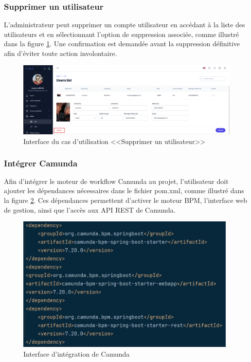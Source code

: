 \subsubsection{Supprimer un utilisateur}
L’administrateur peut supprimer un compte utilisateur en accédant à la liste des utilisateurs et en sélectionnant l’option de suppression associée, comme illustré dans la figure \ref{fig:deleteuser}. Une confirmation est demandée avant la suppression définitive afin d’éviter toute action involontaire.
\begin{figure}[H]
     \centering
     \includegraphics[width=16cm]{images/realisation/sUser.png}
     \caption{Interface du cas d'utilisation <<Supprimer un utilisateur>>}
     \label{fig:deleteuser}
\end{figure}
\newpage
\subsubsection{Intégrer Camunda}
Afin d’intégrer le moteur de workflow Camunda au projet, l’utilisateur doit ajouter les dépendances nécessaires dans le fichier pom.xml, comme illustré dans la figure \ref{fig:camunda-dependencies}. Ces dépendances permettent d’activer le moteur BPM, l’interface web de gestion, ainsi que l’accès aux API REST de Camunda.
\begin{figure}[H]
     \centering
     \includegraphics[width=11cm]{images/realisation/cam.png}
     \caption{Interface d'intégration de Camunda}
     \label{fig:camunda-dependencies}
\end{figure}
